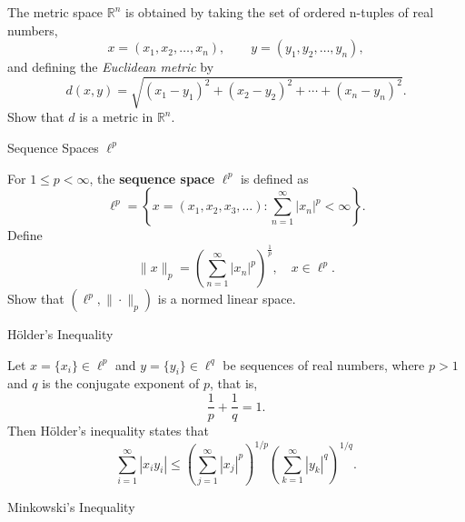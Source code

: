 \documentclass[12pt, a4paper]{article}
\begin{document}
\clearpage

\begin{theorem}
    The metric space $\mathbb{R}^n$ is obtained by taking the set of ordered n-tuples of
    real numbers,
    \[
    x=(x_1,x_2,\ldots,x_n), \qquad y=(y_1,y_2,\ldots,y_n),
    \]
    and defining the \emph{Euclidean metric} by
    \[
    d(x,y)=\sqrt{(x_1-y_1)^2+(x_2-y_2)^2+\cdots+(x_n-y_n)^2}.
    \]    
    Show that $d$ is a metric in $\mathbb{R}^n$.
\end{theorem}

\clearpage

\begin{heading}
    Sequence Spaces $\ell^p$
\end{heading}

\vspace{10pt}

\begin{definition}
    For $1\le p<\infty$, the \textbf{sequence space} $\ell^p$ is defined as
    \[
        \ell^p=\left\{x=(x_1, x_2, x_3, \dots):\sum_{n=1}^\infty|x_n|^p<\infty\right\}.
    \]
    Define \[\|x\|_p=\left(\sum_{n=1}^\infty|x_n|^p\right)^{\frac{1}{p}}, \quad x\in\ell^p.\]
    Show that $(\ell^p,\|\cdot\|_p)$ is a normed linear space.
\end{definition}

\clearpage

\begin{heading}
    Hölder's Inequality
\end{heading}

\vspace{10pt}

\begin{theorem}
Let $x=\{x_i\}\in \ell^p$ and $y=\{y_i\}\in \ell^q$ be sequences of real numbers,
where $p>1$ and $q$ is the conjugate exponent of $p$, that is,
\[
\frac{1}{p}+\frac{1}{q}=1.
\]
Then H\"older's inequality states that
\[
\sum_{i=1}^{\infty} |x_i y_i|
\le
\left(\sum_{j=1}^{\infty} |x_j|^p\right)^{\!1/p}
\left(\sum_{k=1}^{\infty} |y_k|^q\right)^{\!1/q}.
\]
\end{theorem}

\clearpage

\begin{heading}
    Minkowski's Inequality
\end{heading}

\vspace{10pt}
\end{document}
